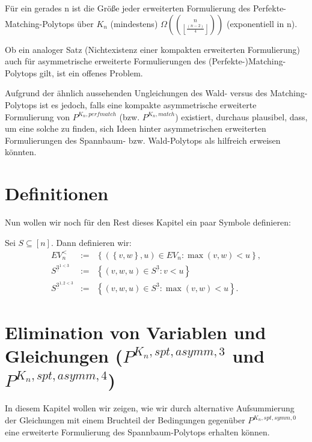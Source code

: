 \documentclass[10p,a4paper,BCOR = 12mm, DIV=15]{scrbook}
\begin{document}
{\begin{Sa}
Für ein gerades n ist die Größe jeder erweiterten Formulierung des Per\-fek\-te-Matching-Polytops über $K_n$ (mindestens) $\Omega \left( 
{
n \choose
\left\lfloor\frac{ \left(n-2\right)}{4} \right\rfloor
}
\right)$ (exponentiell in n).
\end{Sa}

Ob ein analoger Satz (Nichtexistenz einer kompakten erweiterten Formulierung) auch für asymmetrische erweiterte Formulierungen des (Perfekte-)Matching-Polytops gilt, ist ein offenes Problem.

Aufgrund der ähnlich aussehenden Ungleichungen des Wald- versus des Matching-Polytops ist es jedoch, falls eine kompakte asymmetrische erweiterte Formulierung von $P^{K_n, perfmatch}$ (bzw. $P^{K_n, match}$) existiert, durchaus plausibel, dass, um eine solche zu finden, sich Ideen hinter asymmetrischen erweiterten Formulierungen des Spannbaum- bzw. Wald-Polytops als hilfreich erweisen könnten.

\section{Definitionen}

Nun wollen wir noch für den Rest dieses Kapitel ein paar Symbole definieren:

\begin{Def}
Sei $S\subseteq \left[n\right]$. Dann definieren wir:
\begin{eqnarray*}
EV_n^{<} & := & \left\{\left(\left\{v, w\right\}, u\right) \in EV_n: \max\left(v, w\right) < u\right\}, \\
S^{\underline{3}^{1<3}} & := & \left\{\left(v, w, u\right) \in S^{\underline{3}}: v<u\right\} \\
S^{\underline{3}^{1,2<3}} & := & \left\{\left(v, w, u\right) \in S^{\underline{3}}: \max\left(v, w\right) < u\right\}.
\end{eqnarray*}
\end{Def}

\section{Elimination von Variablen und Gleichungen ($P^{K_n, spt, asymm, 3}$ und $P^{K_n, spt, asymm, 4}$)}

In diesem Kapitel wollen wir zeigen, wie wir durch alternative Aufsummierung der Gleichungen mit einem Bruchteil der Bedingungen gegenüber $P^{K_n, spt, symm, 0}$ eine erweiterte Formulierung des Spannbaum-Polytops erhalten können.

}
\end{document}

